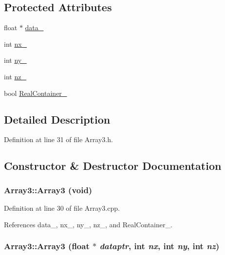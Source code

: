 \subsection*{Protected Attributes}
\begin{DoxyCompactItemize}
\item 
float $\ast$ \hyperlink{classArray3_af704629bb93bda9e842fa627c81d98b2}{data\_\-}
\item 
int \hyperlink{classArray3_add3e47ecef09b38350ea9b45928d068c}{nx\_\-}
\item 
int \hyperlink{classArray3_a5dad0675c57a85ab9f0a5cdc514b04cb}{ny\_\-}
\item 
int \hyperlink{classArray3_a4ccb3e4d630c2bfa4c0ef929c6932c54}{nz\_\-}
\item 
bool \hyperlink{classArray3_af3a70b601302d0219c86118ec831b858}{RealContainer\_\-}
\end{DoxyCompactItemize}


\subsection{Detailed Description}


Definition at line 31 of file Array3.h.



\subsection{Constructor \& Destructor Documentation}
\subsubsection[{Array3}]{\setlength{\rightskip}{0pt plus 5cm}Array3::Array3 (void)}\label{classArray3_a4ee25bec9b5a58da143533e55bd5f1af}


Definition at line 30 of file Array3.cpp.



References data\_\-, nx\_\-, ny\_\-, nz\_\-, and RealContainer\_\-.

\subsubsection[{Array3}]{\setlength{\rightskip}{0pt plus 5cm}Array3::Array3 (float $\ast$ {\em dataptr}, \/  int {\em nx}, \/  int {\em ny}, \/  int {\em nz})}\label{classArray3_a91525ed4449aa68d02727ab646f53d1f}


